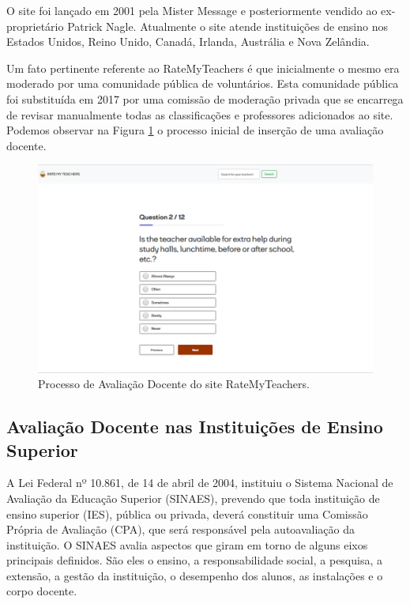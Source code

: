 \documentclass[12pt, a4paper]{report}
\begin{document}
O site foi lançado em 2001 pela Mister Message e posteriormente vendido ao ex-proprietário Patrick Nagle. Atualmente o site atende instituições de ensino nos Estados Unidos, Reino Unido, Canadá, Irlanda, Austrália e Nova Zelândia.

Um fato pertinente referente ao RateMyTeachers é que inicialmente o mesmo era moderado por uma comunidade pública de voluntários. Esta comunidade pública foi substituída em 2017 por uma comissão de moderação privada que se encarrega de revisar manualmente todas as classificações e professores adicionados ao site. Podemos observar na Figura \ref{fig:ratemyteacher} o processo inicial de inserção de uma avaliação docente.

\begin{figure}
\centering
\includegraphics[scale=0.45]{ratemyteachers.png}
\caption{Processo de Avaliação Docente do site RateMyTeachers.}
\label{fig:ratemyteacher}
\end{figure}

\subsection{Avaliação Docente nas Instituições de Ensino Superior}

 A Lei Federal nº 10.861, de 14 de abril de 2004, instituiu o Sistema Nacional de Avaliação da Educação Superior (SINAES), prevendo que toda instituição de ensino superior (IES), pública ou privada, deverá constituir uma Comissão Própria de Avaliação (CPA), que será responsável pela autoavaliação da instituição. O SINAES avalia aspectos que giram em torno de alguns eixos principais definidos. São eles o ensino, a responsabilidade social, a pesquisa, a extensão, a gestão da instituição, o desempenho dos alunos, as instalações e o corpo docente.
 
\end{document}
